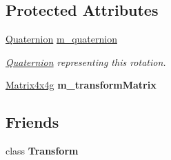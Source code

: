 \subsection*{Protected Attributes}
\begin{DoxyCompactItemize}
\item 
\mbox{\label{classrev_1_1_rotation_component_a8c0a14a0426b4b53447efb9c772c6ebc}} 
\mbox{\hyperlink{classrev_1_1_quaternion}{Quaternion}} \mbox{\hyperlink{classrev_1_1_rotation_component_a8c0a14a0426b4b53447efb9c772c6ebc}{m\+\_\+quaternion}}
\begin{DoxyCompactList}\small\item\em \mbox{\hyperlink{classrev_1_1_quaternion}{Quaternion}} representing this rotation. \end{DoxyCompactList}\item 
\mbox{\label{classrev_1_1_rotation_component_abef60dc75cd471c446ef8d8d180fdeb5}} 
\mbox{\hyperlink{classrev_1_1_square_matrix}{Matrix4x4g}} {\bfseries m\+\_\+transform\+Matrix}
\end{DoxyCompactItemize}
\subsection*{Friends}
\begin{DoxyCompactItemize}
\item 
\mbox{\label{classrev_1_1_rotation_component_af851b4d9aacd1a871da33592334b8d72}} 
class {\bfseries Transform}
\end{DoxyCompactItemize}
